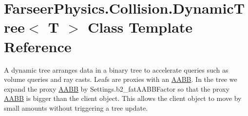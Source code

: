 \hypertarget{class_farseer_physics_1_1_collision_1_1_dynamic_tree_3_01_t_01_4}{\section{Farseer\+Physics.\+Collision.\+Dynamic\+Tree$<$ T $>$ Class Template Reference}
\label{class_farseer_physics_1_1_collision_1_1_dynamic_tree_3_01_t_01_4}
}


A dynamic tree arranges data in a binary tree to accelerate queries such as volume queries and ray casts. Leafs are proxies with an \hyperlink{struct_farseer_physics_1_1_collision_1_1_a_a_b_b}{A\+A\+B\+B}. In the tree we expand the proxy \hyperlink{struct_farseer_physics_1_1_collision_1_1_a_a_b_b}{A\+A\+B\+B} by Settings.\+b2\+\_\+fat\+A\+A\+B\+B\+Factor so that the proxy \hyperlink{struct_farseer_physics_1_1_collision_1_1_a_a_b_b}{A\+A\+B\+B} is bigger than the client object. This allows the client object to move by small amounts without triggering a tree update.  



